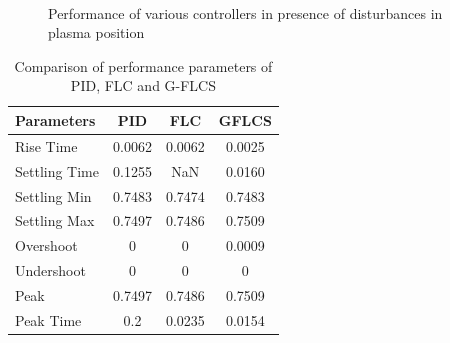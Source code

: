 \begin{figure}[h!]
	\centering
	 \\
	\caption{Performance of various controllers in presence of disturbances in plasma position} 
	\label{fig:Fig11_Final_Figure_PhD}
\end{figure}

\begin{table}[h!]
	\centering
	\caption{Comparison of performance parameters of PID, FLC\cite{Suratia2012} and G-FLCS}
	\label{tab:5_comp}
	\begin{tabular}{lccc}
		\hline
		Parameters & PID & FLC\cite{Suratia2012} & GFLCS \\ \hline
		Rise Time & 0.0062 & 0.0062 & 0.0025 \\
		Settling Time & 0.1255 & NaN & 0.0160 \\
		Settling Min & 0.7483 & 0.7474 & 0.7483 \\
		Settling Max & 0.7497 & 0.7486 & 0.7509 \\
		Overshoot & 0 & 0 & 0.0009 \\
		Undershoot & 0 & 0 & 0 \\
		Peak & 0.7497 & 0.7486 & 0.7509 \\
		Peak Time & 0.2 & 0.0235 & 0.0154 \\ \hline
	\end{tabular}
\end{table}
